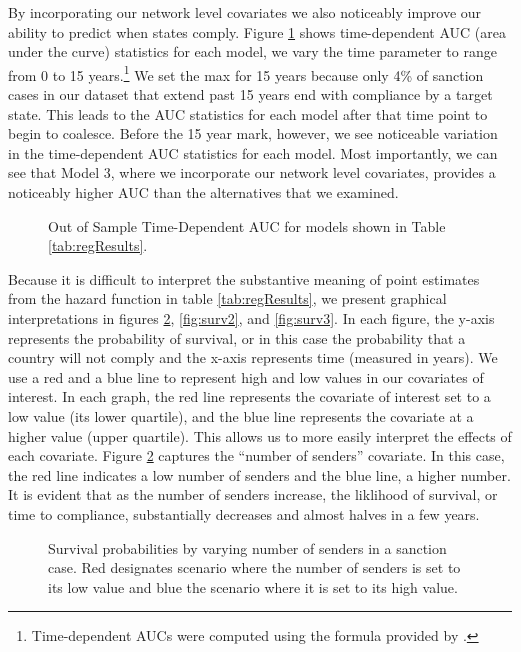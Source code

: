 By incorporating our network level covariates we also noticeably improve our ability to predict when states comply. Figure \ref{fig:auc} shows time-dependent AUC (area under the curve) statistics for each model, we vary the time parameter to range from 0 to 15 years.\footnote{Time-dependent AUCs were computed using the formula provided by \citet{chambless2006estimation}.} We set the max for 15 years because only 4\% of sanction cases in our dataset that extend past 15 years end with compliance by a target state. This leads to the AUC statistics for each model after that time point to begin to coalesce. Before the 15 year mark, however, we see noticeable variation in the time-dependent AUC statistics for each model. Most importantly, we can see that Model 3, where we incorporate our network level covariates, provides a noticeably higher AUC than the alternatives that we examined.

\begin{figure}[ht]
	\centering
	\caption{Out of Sample Time-Dependent AUC for models shown in Table \ref{tab:regResults}.}
	\resizebox{0.8\textwidth}{!}{}
	\label{fig:auc}
\end{figure}
\FloatBarrier

Because it is difficult to interpret the substantive meaning of point estimates from the hazard function in table \ref{tab:regResults}, we present graphical interpretations in figures \ref{fig:surv1}, \ref{fig:surv2}, and \ref{fig:surv3}. In each figure, the y-axis represents the probability of survival, or in this case the probability that a country will not comply and the x-axis represents time (measured in years). We use a red and a blue line to represent high and low values in our covariates of interest. In each graph, the red line represents the covariate of interest set to a low value (its lower quartile), and the blue line represents the covariate at a higher value (upper quartile). This allows us to more easily interpret the effects of each covariate. Figure \ref{fig:surv1} captures the ``number of senders'' covariate. In this case, the red line indicates a low number of senders and the blue line, a higher number. It is evident that as the number of senders increase, the liklihood of survival, or time to compliance, substantially decreases and almost halves in a few years. 

\begin{figure}[ht]
	\centering
	\caption{Survival probabilities by varying number of senders in a sanction case. Red designates scenario where the number of senders is set to its low value and blue the scenario where it is set to its high value.}
	\resizebox{0.7\textwidth}{!}{}
	\label{fig:surv1}
\end{figure}
\FloatBarrier

